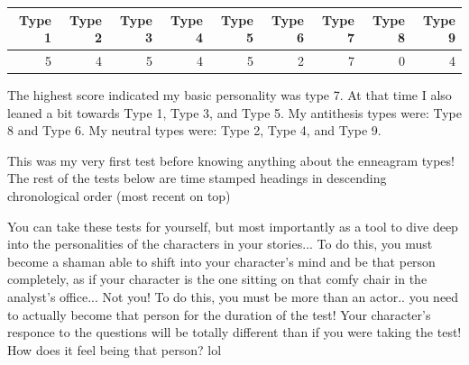 \documentclass[openleft,oneside,showtrims]{memoir}
\begin{document}
\begin{center}
\begin{tabular}{rrrrrrrrr}
\hline
Type 1 & Type 2 & Type 3 & Type 4 & Type 5 & Type 6 & Type 7 & Type 8 & Type 9\\
\hline
5 & 4 & 5 & 4 & 5 & 2 & 7 & 0 & 4\\
\hline
\end{tabular}
\end{center}

The highest score indicated my basic personality was type 7.  At that time I also leaned a bit towards Type 1, Type 3, and Type 5.  My antithesis types were: Type 8 and Type 6.  My neutral types were: Type 2, Type 4, and Type 9.

This was my very first test before knowing anything about the enneagram types!  The rest of the tests below are time stamped headings in descending chronological order (most recent on top)

You can take these tests for yourself, but most importantly as a tool to dive deep into the personalities of the characters in your stories... To do this, you must become a shaman able to shift into your character's mind and be that person completely, as if your character is the one sitting on that comfy chair in the analyst's office... Not you! To do this, you must be more than an actor.. you need to actually become that person for the duration of the test!  Your character's responce to the questions will be totally different than if you were taking the test!  How does it feel being that person? lol
\end{document}
